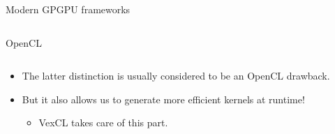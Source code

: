 \documentclass[@BEAMER_OPTIONS@]{beamer}
\begin{document}
\begin{frame}{Modern GPGPU frameworks}
\begin{columns}
\begin{column}{0.45\textwidth}
\begin{block}{OpenCL}
            \end{block}
        \end{column}
    \end{columns}
    \vspace{\baselineskip}
    \pause
    \begin{itemize}
        \item The latter distinction is usually considered to be an OpenCL
            drawback.
        \item But it also allows us to generate more efficient kernels at
            runtime!
            \begin{itemize}
                \item VexCL takes care of this part.
            \end{itemize}
    \end{itemize}
\end{frame}

\end{document}
